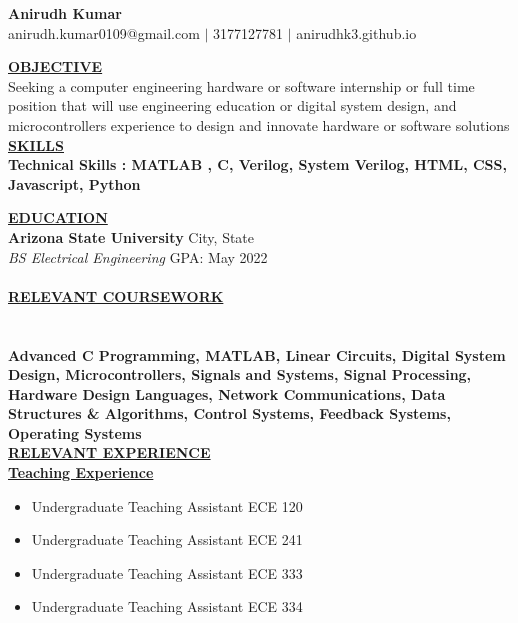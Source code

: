 \documentclass{article}
\begin{document}
\begin{center}
\thispagestyle{empty}
\large \textbf{Anirudh Kumar \\}
\normalsize anirudh.kumar0109@gmail.com $\mid$ 3177127781 $\mid$ anirudhk3.github.io  \\
\hrulefill
\end{center}

\noindent \textbf{\underline{OBJECTIVE}} \\
\noindent Seeking a computer engineering hardware or software internship or full time position that will use engineering education or digital system design, and microcontrollers experience to design and innovate hardware or software solutions  \\



\noindent \textbf{\underline{SKILLS}} \\
\textbf{Technical Skills : MATLAB , C, Verilog, System Verilog, HTML, CSS, Javascript, Python}



\noindent \textbf{\underline{EDUCATION}} \\
\textbf{Arizona State University} \hfill City, State \\
\textit{BS Electrical Engineering} \hfill GPA:  \hfill May 2022 \\ \\

\noindent \textbf{\underline{RELEVANT COURSEWORK}}\\ \\ \\
\textbf{Advanced C Programming, MATLAB, Linear Circuits, Digital System Design, Microcontrollers, Signals and Systems, Signal Processing, Hardware Design Languages, Network Communications, Data Structures \& Algorithms, Control Systems, Feedback Systems, Operating Systems}\\ 

\noindent \textbf{\underline{RELEVANT EXPERIENCE}} \\
\noindent \textbf{\underline{Teaching Experience}}
\begin{itemize}[noitemsep,nolistsep,leftmargin=*]
\item {Undergraduate Teaching Assistant ECE 120}
\item {Undergraduate Teaching Assistant ECE 241}
\item {Undergraduate Teaching Assistant ECE 333}
\item {Undergraduate Teaching Assistant ECE 334}
\end{itemize}
\end{document}
